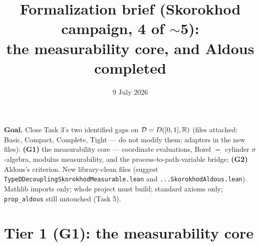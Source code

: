 \documentclass[11pt]{article}
\title{Formalization brief (Skorokhod campaign, 4 of $\sim$5):\\
the measurability core, and Aldous completed}
\date{9 July 2026}
\theoremstyle{plain}
\theoremstyle{remark}
\newcommand{\D}{\mathcal D}\newcommand{\Q}{\mathbb Q}\newcommand{\eps}{\varepsilon}
\begin{document}
\maketitle

\noindent\textbf{Goal.} Close Task 3's two identified gaps on
$\D=D([0,1],\R)$ (files attached: Basic, Compact, Complete, Tight --- do not
modify them; adapters in the new files): \textbf{(G1)} the measurability core
--- coordinate evaluations, Borel $=$ cylinder $\sigma$-algebra, modulus
measurability, and the process-to-path-variable bridge; \textbf{(G2)} Aldous's
criterion. New library-clean files (suggest
\texttt{TypeDDecouplingSkorokhodMeasurable.lean} and
\texttt{...SkorokhodAldous.lean}). Mathlib imports only; whole project must
build; standard axioms only; \texttt{prop\_aldous} still untouched (Task 5).

\section*{Tier 1 (G1): the measurability core}
\end{document}
